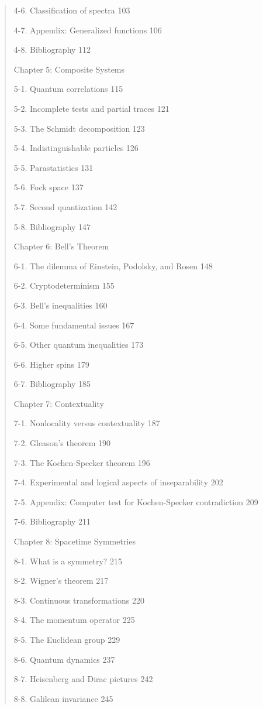 \documentclass{article}
\begin{document}
\begin{quote}
4-6. Classification of spectra 103

4-7. Appendix: Generalized functions 106

4-8. Bibliography 112

Chapter 5: Composite Systems

5-1. Quantum correlations 115

5-2. Incomplete tests and partial traces 121

5-3. The Schmidt decomposition 123

5-4. Indistinguishable particles 126

5-5. Parastatistics 131

5-6. Fock space 137

5-7. Second quantization 142

5-8. Bibliography 147

Chapter 6: Bell's Theorem

6-1. The dilemma of Einstein, Podolsky, and Rosen 148

6-2. Cryptodeterminism 155

6-3. Bell's inequalities 160

6-4. Some fundamental issues 167

6-5. Other quantum inequalities 173

6-6. Higher spins 179

6-7. Bibliography 185

Chapter 7: Contextuality

7-1. Nonlocality versus contextuality 187

7-2. Gleason's theorem 190

7-3. The Kochen-Specker theorem 196

7-4. Experimental and logical aspects of inseparability 202

7-5. Appendix: Computer test for Kochen-Specker contradiction 209

7-6. Bibliography 211

Chapter 8: Spacetime Symmetries

8-1. What is a symmetry? 215

8-2. Wigner's theorem 217

8-3. Continuous transformations 220

8-4. The momentum operator 225

8-5. The Euclidean group 229

8-6. Quantum dynamics 237

8-7. Heisenberg and Dirac pictures 242

8-8. Galilean invariance 245


\end{quote}
\end{document}
